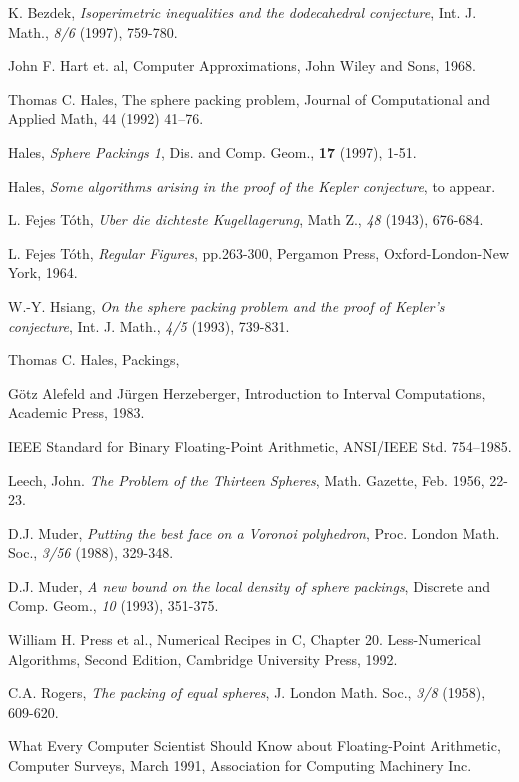 \documentclass{llncs}
\begin{document}
\begin{thebibliography}{}

 K. Bezdek, {\it Isoperimetric inequalities and the
dodecahedral conjecture}, Int. J. Math., \emph{8/6} (1997), 759-780.


 John F. Hart et. al, Computer Approximations, John
Wiley and Sons, 1968.

 Thomas C. Hales, The sphere packing problem, Journal
of Computational and Applied Math, 44 (1992) 41--76.

 Hales, {\it Sphere Packings 1}, Dis. and Comp. Geom., 
{\bf 17} (1997), 1-51.

 Hales, {\it Some algorithms arising in the proof of the
	Kepler conjecture}, to appear.


 L. Fejes T\'oth, {\it Uber die dichteste
Kugellagerung}, Math Z., \emph{48} (1943), 676-684.

 L. Fejes T\'oth, {\it Regular Figures}, pp.263-300,
Pergamon Press, Oxford-London-New York, 1964.

 W.-Y. Hsiang, {\it On the sphere packing problem and
the proof of Kepler's conjecture}, Int. J. Math., \emph{4/5} (1993),
739-831.

 Thomas C. Hales, Packings,\hfill\break{}

 G\"otz Alefeld and J\"urgen Herzeberger,
Introduction to Interval Computations, Academic Press, 1983.


 IEEE Standard for Binary Floating-Point Arithmetic,
ANSI/IEEE Std. 754--1985.

 Leech, John.  {\it The Problem of the Thirteen
Spheres}, Math. Gazette, Feb. 1956, 22-23.

 D.J. Muder, {\it Putting the best face on a Voronoi
polyhedron}, Proc. London Math. Soc., \emph{3/56} (1988), 329-348.

 D.J. Muder, {\it A new bound on the local density of
sphere packings}, Discrete and Comp. Geom., \emph{10} (1993), 351-375.


 William H. Press et al., Numerical Recipes in C,
Chapter 20. Less-Numerical Algorithms, Second Edition, Cambridge
University Press, 1992.

 C.A. Rogers, {\it The packing of equal spheres},
J. London Math. Soc., \emph{3/8} (1958), 609-620.

 What Every Computer Scientist Should Know about
Floating-Point Arithmetic, Computer Surveys, March 1991, Association
for Computing Machinery Inc.

\end{thebibliography}
\end{document}
